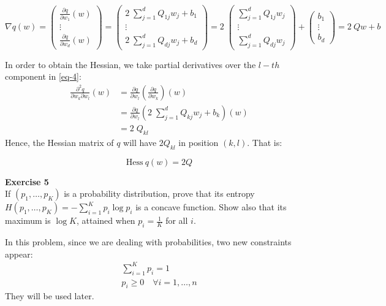 \documentclass[11pt,table]{article}
\newenvironment{problem}[2][Exercise]
    { \begin{mdframed}[backgroundcolor=gray!20] \textbf{#1 #2} \\}
    {  \end{mdframed}}
\begin{document}
\[
	\nabla q(w) = \begin{pmatrix}
		\frac{\partial q}{\partial w_1} (w) \\
		\vdots \\
		\frac{\partial q}{\partial w_d} (w)
	\end{pmatrix}
	= \begin{pmatrix}
		2 \; \sum_{j=1}^{d} Q_{1j} w_{j} + b_{1} \\
		\vdots \\
		2 \; \sum_{j=1}^{d} Q_{dj} w_{j} + b_{d}
	\end{pmatrix}
	= 2 \; \begin{pmatrix}
		\sum_{j=1}^{d} Q_{1j} w_{j} \\
		\vdots \\
		\sum_{j=1}^{d} Q_{dj} w_{j}
	\end{pmatrix} + \begin{pmatrix}
		b_{1} \\
		\vdots \\
		b_{d}
	\end{pmatrix}
	= 2 \ Qw + b
\]

In order to obtain the Hessian, we take partial derivatives over the \(l-th\) component in \ref{eq-4}:
\begin{align*}
	\frac{\partial^2 q}{\partial w_k \partial w_l} (w) & = \frac{\partial q}{\partial w_l} \left( \frac{\partial q}{\partial w_k} \right) (w) \\
	& = \frac{\partial q}{\partial w_l} \left( 2 \; \sum_{j=1}^{d} Q_{kj} w_{j} + b_{k} \right) (w) \\
	& = 2 \; Q_{kl}
\end{align*}
Hence, the Hessian matrix of \(q\) will have \(2 Q_{kl}\) in position \((k, l)\). That is:

\[
	\text{Hess} \ q(w) = 2Q
\]

\begin{problem}{5}
	If \( (p_1,\dots,p_K) \) is a probability distribution, prove that its entropy \( H(p_1, \dots, p_K) = - \sum_{i=1}^K p_i \log p_i\) is a concave function. Show also that its maximum is \( \log K \), attained when \( p_i = \frac{1}{K}\) for all $i$.
\end{problem}


In this problem, since we are dealing with probabilities, two new constraints appear:
\begin{align*}
\sum_{i=1}^K p_i = 1\\
p_i \geq 0 \quad \forall i =1,\dots,n
\end{align*}
They will be used later.\\
\end{document}
